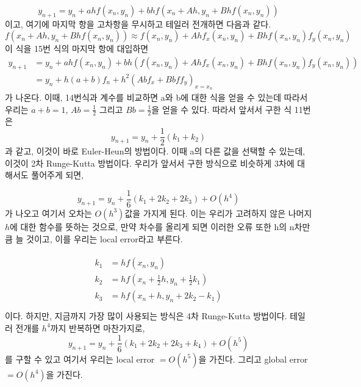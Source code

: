 \documentclass[11pt]{article}
\begin{document}
\begin{equation}
y_{n + 1} = y_n + a h f(x_n, y_n) + b h f(x_n + Ah, y_n + Bh f(x_n, y_n))
\end{equation}
이고, 여기에 마지막 항을 고차항을 무시하고 테일러 전개하면 다음과 같다.
\begin{equation}
f(x_n + Ah, y_n + Bh f(x_n, y_n))
\approx
f(x_n, y_n)
+
Ah f_x(x_n, y_n)
+
Bh f(x_n, y_n) f_y(x_n, y_n)
\end{equation}
이 식을 15번 식의 마지막 항에 대입하면
\begin{equation}
\begin{align}
y_{n + 1} &= y_n + a h f(x_n, y_n) + b h (f(x_n, y_n)
+
Ah f_x(x_n, y_n)
+
Bh f(x_n, y_n) f_y(x_n, y_n))
\\
&= y_n + h(a + b)f_n
+ h^2 (Ab f_x + Bb f f_y)_{x = x_n}
\end{align}
\end{equation}
가 나온다. 이때, 14번식과 계수를 비교하면 a와 b에 대한 식을 얻을 수 있는데 따라서 우리는 $a + b = 1$, $Ab = \frac{1}{2}$ 그리고 $Bb = \frac{1}{2}$을 얻을 수 있다. 따라서 앞서서 구한 식 11번은
\begin{equation}
y_{n + 1} = y_n + \frac{1}{2}(k_1 + k_2)
\end{equation}
과 같고, 이것이 바로 Euler-Heun의 방법이다. 이때 a의 다른 값을 선택할 수 있는데, 이것이 2차 Runge-Kutta 방법이다. 우리가 앞서서 구한 방식으로 비슷하게 3차에 대해서도 풀어주게 되면, 

\begin{equation}
y_{n + 1} = y_n + \frac{1}{6}(k_1 + 2k_2 + 2k_3) + O(h^4)
\end{equation}
가 나오고 여기서 오차는 $O(h^3)$값을 가지게 된다. 이는 우리가 고려하지 않은 나머지 $h$에 대한 함수를 뜻하는 것으로, 만약 차수를 올리게 되면 이러한 오류 또한 h의 n차만큼 늘 것이고, 이를 우리는 local error라고 부른다. 

\begin{equation}
\begin{split}
\begin{aligned}
k_1 &= h f(x_n, y_n) \\
k_2 &= h f\left(x_n + \frac{1}{2}h, y_n + \frac{1}{2}k_1\right) \\
k_3 &= h f\left(x_n + h, y_n + 2k_2 - k_1\right) \\
\end{aligned}
\end{split}
\end{equation}
이다. 하지만, 지금까지 가장 많이 사용되는 방식은 4차 Runge-Kutta 방법이다. 테일러 전개를 $h^4$까지 반복하면 마찬가지로,
\begin{equation}
y_{n + 1} = y_n + \frac{1}{6}(k_1 + 2k_2 + 2k_3 + k_4) + O(h^5)
\end{equation}
를 구할 수 있고 여기서 우리는 local error $= O(h^5)$을 가진다. 그리고 global error $= O(h^4)$을 가진다.
\end{document}
